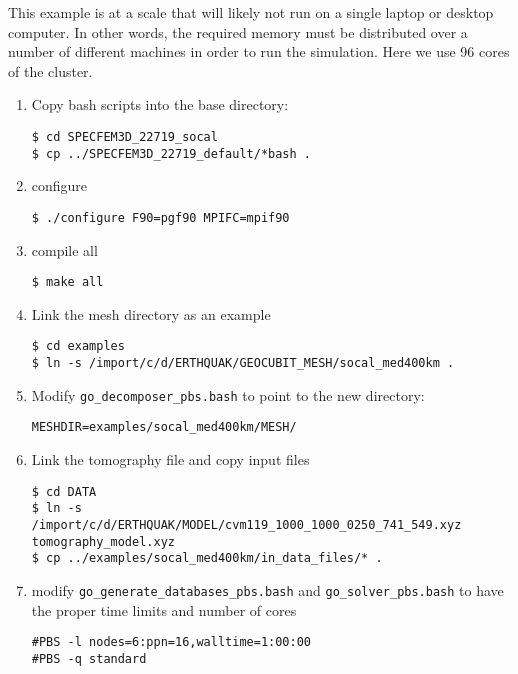 \documentclass[10pt,fleqn,letterpaper]{article}
\begin{document}
This example is at a scale that will likely not run on a single laptop or desktop computer. In other words, the required memory must be distributed over a number of different machines in order to run the simulation. Here we use 96 cores of the cluster.

\begin{enumerate}
\item Copy bash scripts into the base directory:

\begin{lstlisting}
$ cd SPECFEM3D_22719_socal
$ cp ../SPECFEM3D_22719_default/*bash .
\end{lstlisting}

\item configure
\begin{lstlisting}
$ ./configure F90=pgf90 MPIFC=mpif90
\end{lstlisting}

\item compile all
\begin{lstlisting}
$ make all
\end{lstlisting}

\item Link the mesh directory as an example
\begin{lstlisting}
$ cd examples
$ ln -s /import/c/d/ERTHQUAK/GEOCUBIT_MESH/socal_med400km .
\end{lstlisting}

\item Modify \verb+go_decomposer_pbs.bash+ to point to the new directory:
\begin{lstlisting}
MESHDIR=examples/socal_med400km/MESH/
\end{lstlisting}

\item Link the tomography file and copy input files
\begin{lstlisting}
$ cd DATA
$ ln -s /import/c/d/ERTHQUAK/MODEL/cvm119_1000_1000_0250_741_549.xyz tomography_model.xyz
$ cp ../examples/socal_med400km/in_data_files/* .
\end{lstlisting}

\item modify \verb+go_generate_databases_pbs.bash+ and \verb+go_solver_pbs.bash+ to have the proper time limits and number of cores
\begin{lstlisting}
#PBS -l nodes=6:ppn=16,walltime=1:00:00
#PBS -q standard
\end{lstlisting}

%
%


\end{enumerate}
\end{document}
